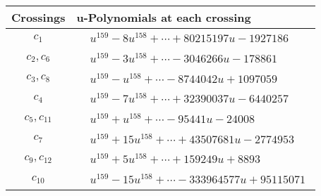 \documentclass[1p]{elsarticle_modified}
\theoremstyle{definition}
\begin{document}
\begin{tabular}{m{50pt}|m{274pt}}
Crossings & \hspace{64pt}u-Polynomials at each crossing \\
\hline $$\begin{aligned}c_{1}\end{aligned}$$&$\begin{aligned}
&u^{159}-8 u^{158}+\cdots+80215197 u-1927186
\end{aligned}$\\
\hline $$\begin{aligned}c_{2},c_{6}\end{aligned}$$&$\begin{aligned}
&u^{159}-3 u^{158}+\cdots-3046266 u-178861
\end{aligned}$\\
\hline $$\begin{aligned}c_{3},c_{8}\end{aligned}$$&$\begin{aligned}
&u^{159}- u^{158}+\cdots-8744042 u+1097059
\end{aligned}$\\
\hline $$\begin{aligned}c_{4}\end{aligned}$$&$\begin{aligned}
&u^{159}-7 u^{158}+\cdots+32390037 u-6440257
\end{aligned}$\\
\hline $$\begin{aligned}c_{5},c_{11}\end{aligned}$$&$\begin{aligned}
&u^{159}+u^{158}+\cdots-95441 u-24008
\end{aligned}$\\
\hline $$\begin{aligned}c_{7}\end{aligned}$$&$\begin{aligned}
&u^{159}+15 u^{158}+\cdots+43507681 u-2774953
\end{aligned}$\\
\hline $$\begin{aligned}c_{9},c_{12}\end{aligned}$$&$\begin{aligned}
&u^{159}+5 u^{158}+\cdots+159249 u+8893
\end{aligned}$\\
\hline $$\begin{aligned}c_{10}\end{aligned}$$&$\begin{aligned}
&u^{159}-15 u^{158}+\cdots-333964577 u+95115071
\end{aligned}$\\
\hline
\end{tabular}\\~\\
\end{document}
